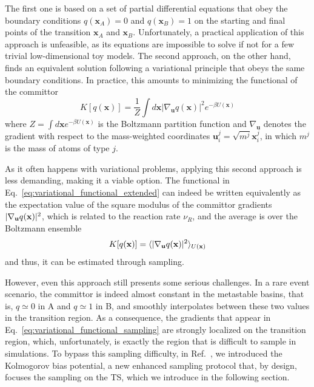         The first one is based on a set of partial differential equations that obey the boundary conditions $q(\textbf{x}_A) = 0$ and $q(\textbf{x}_B) = 1$ on the starting and final points of the transition $\textbf{x}_A$ and $\textbf{x}_B$. 
        Unfortunately, a practical application of this approach is unfeasible, as its equations are impossible to solve if not for a few trivial low-dimensional toy models.
        The second approach, on the other hand, finds an equivalent solution following a variational principle that obeys the same boundary conditions.
        In practice, this amounts to minimizing the functional of the committor
            \begin{equation}
                K[q(\textbf{x})]=\frac{1}{Z} \int d\textbf{x} |\nabla_\textbf{u} q(\textbf{x})|^2 e^{-\beta U(\textbf{x})}
                \label{eq:variational_functional_extended}
            \end{equation}
        where $Z=\int d\textbf{x} e^{-\beta U(\textbf{x})}$ is the Boltzmann partition function and $\nabla_\textbf{u}$ denotes the gradient with respect to the mass-weighted coordinates $\textbf{u}_i^j = \sqrt{m^j} \textbf{x}_i^j$, in which $m^j$ is the mass of atoms of type $j$. 
        
        As it often happens with variational problems, applying this second approach is less demanding, making it a viable option.
        The functional in Eq.~\ref{eq:variational_functional_extended} can indeed be written equivalently as the expectation value of the square modulus of the committor gradients $|\nabla_\textbf{u} q(\textbf x)|^2$, which is related to the reaction rate $\nu_R$, and the average is over the Boltzmann ensemble
            \begin{equation}
                K[q(\textbf{x})] = \langle |\nabla_\textbf{u} q(\textbf x)|^2 \rangle _{U(\textbf{x})}  
                \label{eq:variational_functional_sampling}
            \end{equation}
        and thus, it can be estimated through sampling.
        
        However, even this approach still presents some serious challenges.
        In a rare event scenario, the committor is indeed almost constant in the metastable basins, that is, $q\simeq0$ in A and $q\simeq1$ in B, and smoothly interpolates between these two values in the transition region.
        As a consequence, the gradients that appear in Eq.~\ref{eq:variational_functional_sampling} are strongly localized on the transition region, which, unfortunately, is exactly the region that is difficult to sample in simulations.
        To bypass this sampling difficulty, in Ref.~, we introduced the Kolmogorov bias potential, a new enhanced sampling protocol that, by design, focuses the sampling on the TS, which we introduce in the following section.
    
